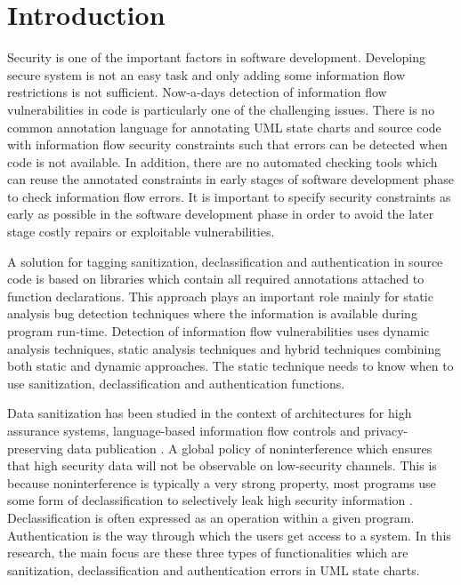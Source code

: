 \chapter{Introduction}
\label{chapter:Introduction}
Security is one of the important factors in software development. Developing secure system is not an easy task and only adding some information flow restrictions is not sufficient. Now-a-days detection of information flow vulnerabilities in code is particularly one of the challenging issues. There is no common annotation language for annotating UML state charts and source code with information flow security constraints such that errors can be detected when code is not available. In addition, there are
no automated checking tools which can reuse the annotated constraints in early stages of software development phase to check information flow errors. It is important to specify security constraints as early as possible in the software development phase in order to avoid the later stage costly repairs or exploitable vulnerabilities.

A solution for tagging sanitization, declassification and authentication in source code is based on libraries which contain all required annotations attached to function declarations. This approach plays an important role mainly for static analysis bug detection techniques where the information is available during program run-time. Detection of information flow vulnerabilities uses dynamic analysis techniques, static analysis techniques and hybrid techniques combining both static and dynamic approaches. The static technique needs to know when to use  sanitization, declassification and authentication functions.

Data sanitization has been studied in the context of architectures for high assurance systems, language-based information flow controls and privacy-preserving data publication \cite{ref_1_gehani2011f}. A global policy of noninterference which ensures that high security data will not be observable on low-security channels. This is because noninterference is typically a very strong property, most programs use some form of declassification to selectively leak high security  information \cite{ref_2_hicks2006trusted}. Declassification is often expressed as an operation within a given
program. Authentication is the way through which the users get access to a system. In this research, the main focus are these three types of functionalities which are sanitization, declassification and authentication errors in UML state charts. 

